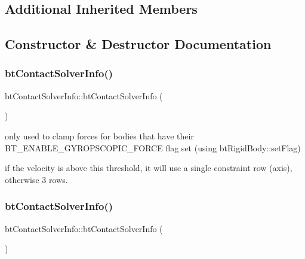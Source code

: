 \subsection*{Additional Inherited Members}


\subsection{Constructor \& Destructor Documentation}
\mbox{\label{structbtContactSolverInfo_a233666cc8ab8288ae84b22145b41d76e}} 
\subsubsection{\texorpdfstring{bt\+Contact\+Solver\+Info()}{btContactSolverInfo()}\hspace{0.1cm}{\footnotesize\ttfamily [1/2]}}
{\footnotesize\ttfamily bt\+Contact\+Solver\+Info\+::bt\+Contact\+Solver\+Info (\begin{DoxyParamCaption}{ }\end{DoxyParamCaption})\hspace{0.3cm}{\ttfamily [inline]}}

only used to clamp forces for bodies that have their B\+T\+\_\+\+E\+N\+A\+B\+L\+E\+\_\+\+G\+Y\+R\+O\+P\+S\+C\+O\+P\+I\+C\+\_\+\+F\+O\+R\+CE flag set (using bt\+Rigid\+Body\+::set\+Flag)

if the velocity is above this threshold, it will use a single constraint row (axis), otherwise 3 rows. \mbox{\label{structbtContactSolverInfo_a233666cc8ab8288ae84b22145b41d76e}} 
\subsubsection{\texorpdfstring{bt\+Contact\+Solver\+Info()}{btContactSolverInfo()}\hspace{0.1cm}{\footnotesize\ttfamily [2/2]}}
{\footnotesize\ttfamily bt\+Contact\+Solver\+Info\+::bt\+Contact\+Solver\+Info (\begin{DoxyParamCaption}{ }\end{DoxyParamCaption})\hspace{0.3cm}{\ttfamily [inline]}}

